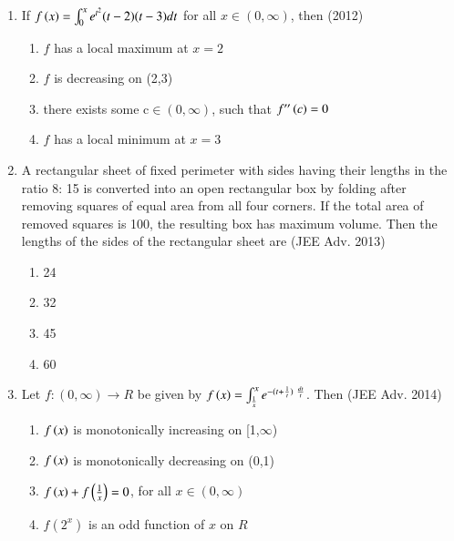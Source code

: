 \documentclass[journal,12pt,twocolumn]{IEEEtran}
\theoremstyle{remark}
\begin{document}
\begin{enumerate}
{        }
    \item{
        
            If $f\left(x\right)= \int_{0}^x e^{t^2}(t-2)(t-3)dt$ for all $x \in(0,\infty)$, then
             \hfill
                {(2012)}
            
            \begin{enumerate}
                \item $f$ has a local maximum at $x=2$ 
                \item $f$ is decreasing on (2,3)
                \item there exists some c$\in(0,\infty)$, such that $f''\left(c\right)=0$
                \item $f$ has a local minimum at $x=3$
            \end{enumerate}
        
        }
    \item{
    
        
            A rectangular sheet of fixed perimeter with sides having their lengths in the ratio 8: 15 is converted into an open rectangular box by folding after removing squares of equal area from all four corners. If the total area of removed squares is 100, the resulting box has maximum volume. Then the lengths of the sides of the rectangular sheet are
             \hfill
                {(JEE Adv. 2013)}
            \begin{multicols}{2}
                \begin{enumerate}
                    \item 24
                    \item 32
                    \item 45
                    \item 60
                \end{enumerate}
            \end{multicols}

        
        }
    \item{
        
            Let $f: (0,\infty)\rightarrow R$ be given by $f\left(x\right) = \int_{\frac{1}{x}}^x e^{-(t + \frac{1}{t})\ \frac{dt}{t}}$. Then
             \hfill
                {(JEE Adv. 2014)}
            
            \begin{enumerate}
                \item $f\left(x\right)$ is monotonically increasing on [1,$\infty$)
                \item $f\left(x\right)$ is monotonically decreasing on (0,1)
                \item $f\left(x\right) + f\left(\frac{1}{x}\right) = 0$, for all $x \in (0,\infty)$
                \item $f(2^x)$ is an odd function of $x$ on $R$ 
            \end{enumerate}
        
}
\end{enumerate}
\end{document}
